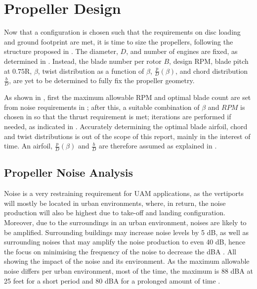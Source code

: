 \section{Propeller Design}
\label{sec:propdesign}
Now that a configuration is chosen such that the requirements on disc loading and ground footprint are met, it is time to size the propellers, following the structure proposed in .
The diameter, $D$, and number of engines are fixed, as determined in . Instead, the blade number per rotor $B$, design RPM, blade pitch at $0.75\text{R}$, $\beta$, twist distribution as a function of $\beta$, $\frac{p}{D}(\beta)$, and chord distribution $\frac{b}{D}$, are yet to be determined to fully fix the propeller geometry.

As shown in , first the maximum allowable RPM and optimal blade count are set from noise requirements in ; after this, a suitable combination of $\beta$ and $RPM$ is chosen in  so that the thrust requirement is met; iterations are performed if needed, as indicated in .
Accurately determining the optimal blade airfoil, chord and twist distributions is out of the scope of this report, mainly in the interest of time. An airfoil, $\frac{p}{D}(\beta)$ and $\frac{b}{D}$ are therefore assumed as explained in .

\subsection{Propeller Noise Analysis}
\label{subsec:propnoiseanalysis}
Noise is a very restraining requirement for UAM applications, as the vertiports will mostly be located in urban environments, where, in return, the noise production will also be highest due to take-off and landing configuration.
Moreover, due to the surroundings in an urban environment, noises are likely to be amplified.
Surrounding buildings may increase noise levels by 5 dB, as well as surrounding noises that may amplify the noise production to even 40 dB, hence the focus on minimising the frequency of the noise to decrease the dBA \cite{ragni2023vertiportnoise}.
All showing the impact of the noise and its environment.
As the maximum allowable noise differs per urban environment, most of the time, the maximum is 88 dBA at 25 feet for a short period and 80 dBA for a prolonged amount of time \cite{moller2022AAMreview}.

